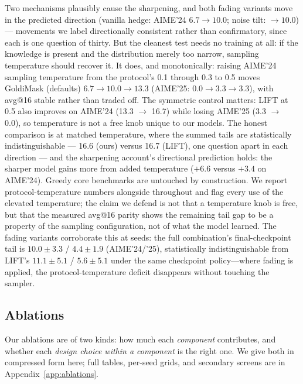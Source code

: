 \documentclass{article} %
\begin{document}
Two mechanisms plausibly cause the sharpening, and both fading variants move in the predicted direction (vanilla hedge: AIME'24 $6.7 \to 10.0$; noise tilt: $\to 10.0$) --- movements we label directionally consistent rather than confirmatory, since each is one question of thirty. But the cleanest test needs no training at all: if the knowledge is present and the distribution merely too narrow, sampling temperature should recover it. It does, and monotonically: raising AIME'24 sampling temperature from the protocol's 0.1 through 0.3 to 0.5 moves GoldiMask (defaults) $6.7 \to 10.0 \to 13.3$ (AIME'25: $0.0 \to 3.3 \to 3.3$), with avg@16 stable rather than traded off. The symmetric control matters: LIFT at 0.5 also improves on AIME'24 (13.3 $\to$ 16.7) while losing AIME'25 (3.3 $\to$ 0.0), so temperature is not a free knob unique to our models. The honest comparison is at matched temperature, where the summed tails are statistically indistinguishable --- 16.6 (ours) versus 16.7 (LIFT), one question apart in each direction --- and the sharpening account's directional prediction holds: the sharper model gains more from added temperature ($+6.6$ versus $+3.4$ on AIME'24). Greedy core benchmarks are untouched by construction. We report protocol-temperature numbers alongside throughout and flag every use of the elevated temperature; the claim we defend is not that a temperature knob is free, but that the measured avg@16 parity shows the remaining tail gap to be a property of the sampling configuration, not of what the model learned. The fading variants corroborate this at seeds: the full combination's final-checkpoint tail is $10.0 \pm 3.3$ / $4.4 \pm 1.9$ (AIME'24/'25), statistically indistinguishable from LIFT's $11.1 \pm 5.1$ / $5.6 \pm 5.1$ under the same checkpoint policy---where fading is applied, the protocol-temperature deficit disappears without touching the sampler.

\subsection{Ablations}
\label{sec:ablations}

Our ablations are of two kinds: how much each \emph{component} contributes, and whether each \emph{design choice within a component} is the right one. We give both in compressed form here; full tables, per-seed grids, and secondary screens are in Appendix~\ref{app:ablations}.
\end{document}
